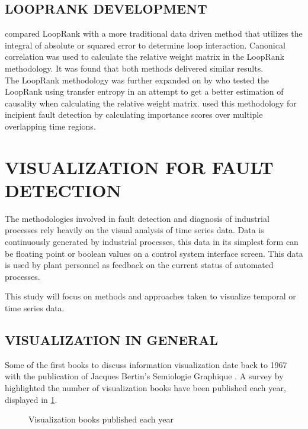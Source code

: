 \subsection{LOOPRANK DEVELOPMENT}

\cite{rahman2010new} compared LoopRank with a more traditional data driven method that utilizes the integral of absolute or squared error to determine loop interaction. Canonical correlation was used to calculate the relative weight matrix in the LoopRank methodology. It was found that both methods delivered similar results.\\ 
The LoopRank methodology was further expanded on by \cite{streicher2014eigenvector} who tested the LoopRank using transfer entropy in an attempt to get a better estimation of causality when calculating the relative weight matrix. \cite{streicher2019plant} used this methodology for incipient fault detection by calculating importance scores over multiple overlapping time regions. \\ 

\section{VISUALIZATION FOR FAULT DETECTION}

The methodologies involved in fault detection and diagnosis of industrial processes rely heavily on the visual analysis of time series data. Data is continuously generated by industrial processes, this data in its simplest form can be floating point or boolean values on a control system interface screen. This data is used by plant personnel as feedback on the current status of automated processes.

This study will focus on methods and approaches taken to visualize temporal or time series data. 

\subsection{VISUALIZATION IN GENERAL}

Some of the first books to discuss information visualization date back to 1967 with the publication of Jacques Bertin's Semiologie Graphique \cite{rees2019survey}. A survey by \cite{rees2019survey} highlighted the number of visualization books have been published each year, displayed in \ref{fig:1}.

\begin{figure}[!ht]
	
	\centering{}
	\caption{Visualization books published each year}\label{fig:1}
	
\end{figure}

